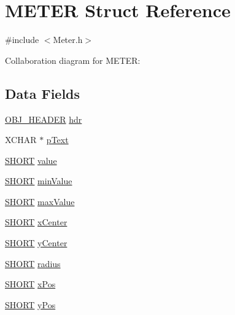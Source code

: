 \hypertarget{struct_m_e_t_e_r}{}\section{M\+E\+T\+E\+R Struct Reference}
\label{struct_m_e_t_e_r}


{\ttfamily \#include $<$Meter.\+h$>$}



Collaboration diagram for M\+E\+T\+E\+R\+:
\subsection*{Data Fields}
\begin{DoxyCompactItemize}
\item 
\hyperlink{struct_o_b_j___h_e_a_d_e_r}{O\+B\+J\+\_\+\+H\+E\+A\+D\+E\+R} \hyperlink{struct_m_e_t_e_r_abeffaf353197a8a64fba6707b68ce0be}{hdr}
\item 
X\+C\+H\+A\+R $\ast$ \hyperlink{struct_m_e_t_e_r_a934b5563cdaf14803728ff3a7b7e8c7f}{p\+Text}
\item 
\hyperlink{_generic_type_defs_8h_ae9bb25d3afecf3bfab0fbe3c22c2050f}{S\+H\+O\+R\+T} \hyperlink{struct_m_e_t_e_r_ac4d3490391236691d132e3085e887474}{value}
\item 
\hyperlink{_generic_type_defs_8h_ae9bb25d3afecf3bfab0fbe3c22c2050f}{S\+H\+O\+R\+T} \hyperlink{struct_m_e_t_e_r_a2ccfd15204020ea8bb6fd3098ba8b241}{min\+Value}
\item 
\hyperlink{_generic_type_defs_8h_ae9bb25d3afecf3bfab0fbe3c22c2050f}{S\+H\+O\+R\+T} \hyperlink{struct_m_e_t_e_r_a199f0de6619d97659f45ad4f728819f7}{max\+Value}
\item 
\hyperlink{_generic_type_defs_8h_ae9bb25d3afecf3bfab0fbe3c22c2050f}{S\+H\+O\+R\+T} \hyperlink{struct_m_e_t_e_r_aea1d1e18200cb2a91fcd74c6e1172ba8}{x\+Center}
\item 
\hyperlink{_generic_type_defs_8h_ae9bb25d3afecf3bfab0fbe3c22c2050f}{S\+H\+O\+R\+T} \hyperlink{struct_m_e_t_e_r_aeb7c9f7af073c797530bda5b0989e239}{y\+Center}
\item 
\hyperlink{_generic_type_defs_8h_ae9bb25d3afecf3bfab0fbe3c22c2050f}{S\+H\+O\+R\+T} \hyperlink{struct_m_e_t_e_r_ae5bf5300978dec1b6c69ee537e1c98f8}{radius}
\item 
\hyperlink{_generic_type_defs_8h_ae9bb25d3afecf3bfab0fbe3c22c2050f}{S\+H\+O\+R\+T} \hyperlink{struct_m_e_t_e_r_a54c47eaab0c4f75c83127414666fd5dd}{x\+Pos}
\item 
\hyperlink{_generic_type_defs_8h_ae9bb25d3afecf3bfab0fbe3c22c2050f}{S\+H\+O\+R\+T} \hyperlink{struct_m_e_t_e_r_a983a75cb3392c5927d1c9cc9a2c2f22e}{y\+Pos}

\end{DoxyCompactItemize}
